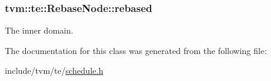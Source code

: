 \subsubsection[{\texorpdfstring{rebased}{rebased}}]{ tvm\+::te\+::\+Rebase\+Node\+::rebased}\hypertarget{classtvm_1_1te_1_1RebaseNode_a3e718d8fd2ae0f2d76b794e6dfa303f0}{}\label{classtvm_1_1te_1_1RebaseNode_a3e718d8fd2ae0f2d76b794e6dfa303f0}


The inner domain. 



The documentation for this class was generated from the following file\+:\begin{DoxyCompactItemize}
\item 
include/tvm/te/\hyperlink{schedule_8h}{schedule.\+h}\end{DoxyCompactItemize}
